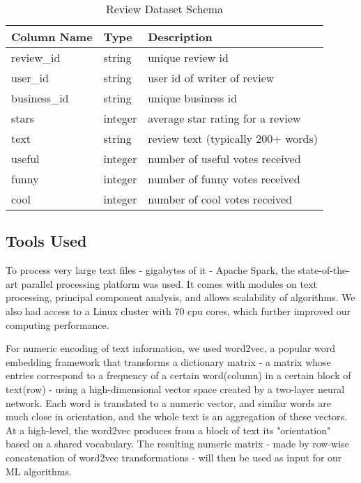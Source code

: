 \documentclass{article}
\begin{document}
\begin{table}[h]
\centering
\begin{tabular}{l l l}
\hline
\textbf{Column Name} & \textbf{Type} & \textbf{Description}\\
\hline
review\_id & string & unique review id \\
user\_id & string & user id of writer of review\\
business\_id & string & unique business id \\
stars & integer & average star rating for a review\\
text & string & review text (typically 200+ words)\\
useful & integer & number of useful votes received\\
funny & integer & number of funny votes received\\
cool & integer & number of cool votes received\\
\hline
\end{tabular}
\caption{Review Dataset Schema}
\end{table}

\subsection{Tools Used}
To process very large text files - gigabytes of it - Apache Spark, the state-of-the-art parallel processing platform was used. It comes with modules on text processing, principal component analysis, and allows scalability of algorithms. We also had access to a Linux cluster with 70 cpu cores, which further improved our computing performance.

For numeric encoding of text information, we used word2vec, a popular word embedding framework that transforms a dictionary matrix - a matrix whose entries correspond to a frequency of a certain word(column) in a certain block of text(row) - using a high-dimensional vector space created by a two-layer neural network. Each word is translated to a numeric vector, and similar words are much close in orientation, and the whole text is an aggregation of these vectors. At a high-level, the word2vec produces from a block of text its "orientation" based on a shared vocabulary. The resulting numeric matrix - made by row-wise concatenation of word2vec transformations - will then be used as input for our ML algorithms.
\end{document}
